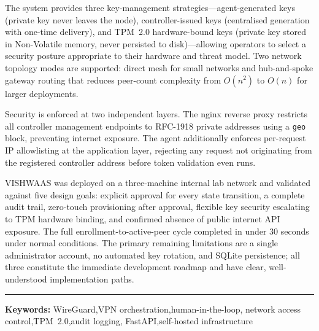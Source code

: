\documentclass[12pt, a4paper]{article}
\begin{document}
The system provides three key-management strategies---agent-generated keys
(private key never leaves the node), controller-issued keys (centralised
generation with one-time delivery), and TPM~2.0 hardware-bound keys (private
key stored in Non-Volatile memory, never persisted to disk)---allowing
operators to select a security posture appropriate to their hardware and
threat model. Two network topology modes are supported: direct mesh for small
networks and hub-and-spoke gateway routing that reduces peer-count complexity
from $O(n^2)$ to $O(n)$ for larger deployments.

Security is enforced at two independent layers. The nginx reverse proxy
restricts all controller management endpoints to RFC-1918 private addresses
using a \texttt{geo} block, preventing internet exposure. The agent
additionally enforces per-request IP allowlisting at the application layer,
rejecting any request not originating from the registered controller address
before token validation even runs.

VISHWAAS was deployed on a three-machine internal lab network and validated
against five design goals: explicit approval for every state transition, a
complete audit trail, zero-touch provisioning after approval, flexible key
security escalating to TPM hardware binding, and confirmed absence of public
internet API exposure. The full enrollment-to-active-peer cycle completed in
under 30 seconds under normal conditions. The primary remaining limitations
are a single administrator account, no automated key rotation, and SQLite
persistence; all three constitute the immediate development roadmap and have
clear, well-understood implementation paths.

\noindent\rule{\linewidth}{0.4pt}

\noindent\textbf{Keywords:}\quad
WireGuard,\enspace VPN orchestration,\enspace human-in-the-loop,\enspace
network access control,\enspace TPM~2.0,\enspace audit logging,\enspace
FastAPI,\enspace self-hosted infrastructure
\end{document}
